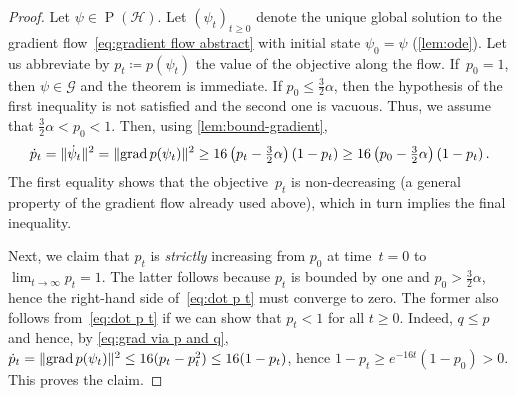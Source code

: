 \documentclass[11pt,a4paper]{article}
\numberwithin{equation}{section}
\newcommand{\HH}{\mathcal{H}}
\newcommand{\GG}{\mathcal G}
\newcommand{\1}{\mathbf{1}}
\renewcommand{\P}{\operatorname{P}}
\DeclareMathOperator{\grad}{grad}
\DeclarePairedDelimiter\norm{\lVert}{\rVert}
\begin{document}
\begin{proof}
Let $\psi\in\P(\HH)$.
Let $(\psi_t)_{t\geq0}$ denote the unique global solution to the gradient flow~\eqref{eq:gradient flow abstract} with initial state $\psi_0=\psi$ (\cref{lem:ode}).
Let us abbreviate by $p_t \coloneq p(\psi_t)$ the value of the objective along the flow.
If~$p_0 = 1$, then $\psi \in \GG$ and the theorem is immediate.
If $p_0 \leq \frac32\alpha$, then the hypothesis of the first inequality is not satisfied and the second one is vacuous.
Thus, we assume that $\frac32\alpha < p_0 < 1$.
Then, using \cref{lem:bound-gradient},
\begin{align}\label{eq:dot p t}
\dot p_t
= \norm{\dot \psi_t}^2
= \norm{\grad p(\psi_t)}^2
\geq 16 \left( p_t - \tfrac32\alpha \right) \left( 1 - p_t \right)
\geq 16 \left( p_0 - \tfrac32\alpha \right) \left( 1 - p_t \right).
\end{align}
The first equality shows that the objective~$p_t$ is non-decreasing (a general property of the gradient flow already used above), which in turn implies the final inequality.

Next, we claim that $p_t$ is \emph{strictly} increasing from $p_0$ at time~$t=0$ to $\lim_{t\to\infty} p_t = 1$.
The latter follows because $p_t$ is bounded by one and $p_0 > \tfrac32\alpha$, hence the right-hand side of~\eqref{eq:dot p t} must converge to zero.
The former also follows from~\eqref{eq:dot p t} if we can show that $p_t < 1$ for all $t \geq 0$.
Indeed, $q \leq p$ and hence, by \cref{eq:grad via p and q}, $\dot p_t = \norm{\grad p(\psi_t)}^2 \leq 16 (p_t - p_t^2) \leq 16 ( 1 - p_t )$, hence $1 - p_t \geq e^{-16t} (1 - p_0) > 0$.
This proves the claim.


\end{proof}
\end{document}
